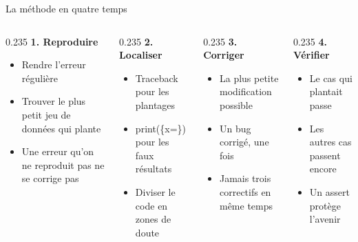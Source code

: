 \documentclass[aspectratio=169,11pt]{beamer}
\begin{document}
\begin{frame}{La méthode en quatre temps}
\begin{columns}[t]
\begin{column}{0.235\textwidth}
{\bfseries\color{PyBleu}1. Reproduire}

\begin{itemize}
  \setlength{\itemsep}{1.5pt}\setlength{\parskip}{0pt}
  \item Rendre l'erreur régulière
  \item Trouver le plus petit jeu de données qui plante
  \item Une erreur qu'on ne reproduit pas ne se corrige pas
\end{itemize}
\end{column}
\hspace{0.015\textwidth}
\begin{column}{0.235\textwidth}
{\bfseries\color{PyBleu}2. Localiser}

\begin{itemize}
  \setlength{\itemsep}{1.5pt}\setlength{\parskip}{0pt}
  \item Traceback pour les plantages
  \item print(\{x=\}) pour les faux résultats
  \item Diviser le code en zones de doute
\end{itemize}
\end{column}
\hspace{0.015\textwidth}
\begin{column}{0.235\textwidth}
{\bfseries\color{PyBleu}3. Corriger}

\begin{itemize}
  \setlength{\itemsep}{1.5pt}\setlength{\parskip}{0pt}
  \item La plus petite modification possible
  \item Un bug corrigé, une fois
  \item Jamais trois correctifs en même temps
\end{itemize}
\end{column}
\hspace{0.015\textwidth}
\begin{column}{0.235\textwidth}
{\bfseries\color{PyBleu}4. Vérifier}

\begin{itemize}
  \setlength{\itemsep}{1.5pt}\setlength{\parskip}{0pt}
  \item Le cas qui plantait passe
  \item Les autres cas passent encore
  \item Un assert protège l'avenir
\end{itemize}
\end{column}
\end{columns}
\end{frame}
\end{document}
